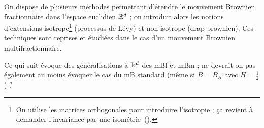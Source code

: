 On dispose de plusieurs méthodes permettant d'étendre le mouvement
Brownien fractionnaire dans l'espace euclidien $\mathbb{R}^d$ ; on introduit
alors les notions d'extensions isotrope\footnote{On utilise les
  matrices orthogonales pour introduire l'isotropie ; ça revient à
  demander l'invariance par une isométrie~(\cite{ayache2018}).}
(processus de Lévy) et non-isotrope (drap brownien). Ces techniques
sont reprises et étudiées dans le cas d'un mouvement Brownien
multifractionnaire.

\begin{question}
  Ce qui suit évoque des généralisations à $\mathbb{R}^d$ des mBf et mBm ; ne
  devrait-on pas également au moins évoquer le cas du mB standard
  (même si $B = B_H$ avec $H=\frac{1}{2}$) ?
\end{question}